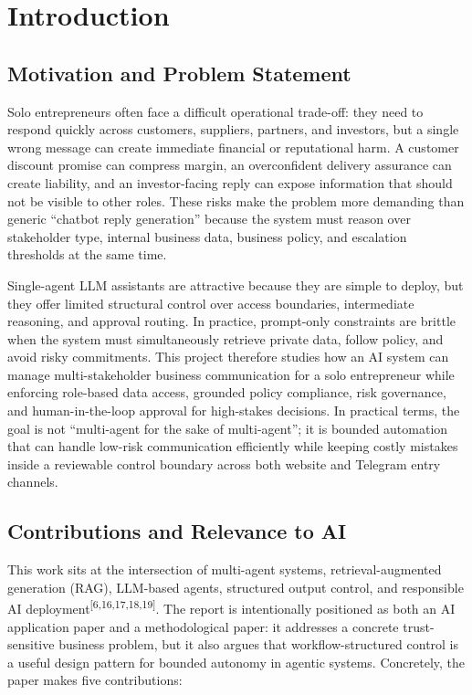 \documentclass[11pt]{article}
\begin{document}
\section{Introduction}
\subsection{Motivation and Problem Statement}
Solo entrepreneurs often face a difficult operational trade-off: they need to respond quickly across customers, suppliers, partners, and investors, but a single wrong message can create immediate financial or reputational harm. A customer discount promise can compress margin, an overconfident delivery assurance can create liability, and an investor-facing reply can expose information that should not be visible to other roles. These risks make the problem more demanding than generic ``chatbot reply generation'' because the system must reason over stakeholder type, internal business data, business policy, and escalation thresholds at the same time.

Single-agent LLM assistants are attractive because they are simple to deploy, but they offer limited structural control over access boundaries, intermediate reasoning, and approval routing. In practice, prompt-only constraints are brittle when the system must simultaneously retrieve private data, follow policy, and avoid risky commitments. This project therefore studies how an AI system can manage multi-stakeholder business communication for a solo entrepreneur while enforcing role-based data access, grounded policy compliance, risk governance, and human-in-the-loop approval for high-stakes decisions. In practical terms, the goal is not ``multi-agent for the sake of multi-agent''; it is bounded automation that can handle low-risk communication efficiently while keeping costly mistakes inside a reviewable control boundary across both website and Telegram entry channels.

\subsection{Contributions and Relevance to AI}
This work sits at the intersection of multi-agent systems, retrieval-augmented generation (RAG), LLM-based agents, structured output control, and responsible AI deployment\textsuperscript{[6,16,17,18,19]}. The report is intentionally positioned as both an AI application paper and a methodological paper: it addresses a concrete trust-sensitive business problem, but it also argues that workflow-structured control is a useful design pattern for bounded autonomy in agentic systems. Concretely, the paper makes five contributions:
\end{document}
